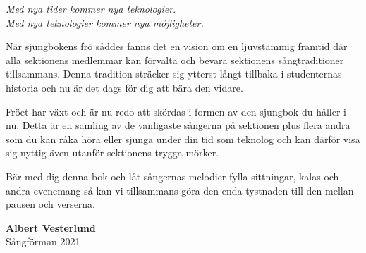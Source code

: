 {\large
\setlength{\parskip}{0.8em}
\textit{Med nya tider kommer nya teknologier.}\\
\textit{Med nya teknologier kommer nya möjligheter.}

När sjungbokens frö såddes fanns det en vision om en ljuvstämmig framtid där alla sektionens medlemmar kan förvalta och bevara sektionens sångtraditioner tillsammans. 
Denna tradition sträcker sig ytterst långt tillbaka i studenternas historia och nu är det dags för dig att bära den vidare.

Fröet har växt och är nu redo att skördas i formen av den sjungbok du håller i nu.
Detta är en samling av de vanligaste sångerna på sektionen plus flera andra som du kan råka höra eller sjunga under din tid som teknolog och kan därför visa sig nyttig även utanför sektionens trygga mörker.

Bär med dig denna bok och låt sångernas melodier fylla sittningar, kalas och andra evenemang så kan vi tillsammans göra den enda tystnaden till den mellan pausen och verserna.

\vspace{.5cm}
\begin{flushright}
\textbf{Albert Vesterlund}\\
Sångförman 2021\\
\end{flushright}
}

%

